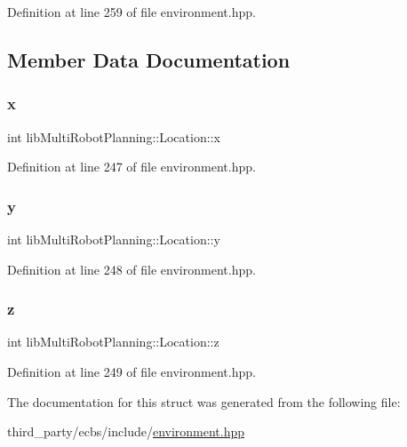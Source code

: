 Definition at line 259 of file environment.\+hpp.



\subsection{Member Data Documentation}
\mbox{\label{structlib_multi_robot_planning_1_1_location_a8b9baca7fdc69a97d8071666af608f82}} 
\subsubsection{\texorpdfstring{x}{x}}
{\footnotesize\ttfamily int lib\+Multi\+Robot\+Planning\+::\+Location\+::x}



Definition at line 247 of file environment.\+hpp.

\mbox{\label{structlib_multi_robot_planning_1_1_location_a83d2a4d9d01f2c12e2a567a86ca3893a}} 
\subsubsection{\texorpdfstring{y}{y}}
{\footnotesize\ttfamily int lib\+Multi\+Robot\+Planning\+::\+Location\+::y}



Definition at line 248 of file environment.\+hpp.

\mbox{\label{structlib_multi_robot_planning_1_1_location_a6c016b7c0360b6dee839189d91fdfd72}} 
\subsubsection{\texorpdfstring{z}{z}}
{\footnotesize\ttfamily int lib\+Multi\+Robot\+Planning\+::\+Location\+::z}



Definition at line 249 of file environment.\+hpp.



The documentation for this struct was generated from the following file\+:\begin{DoxyCompactItemize}
\item 
third\+\_\+party/ecbs/include/\hyperlink{environment_8hpp}{environment.\+hpp}\end{DoxyCompactItemize}
